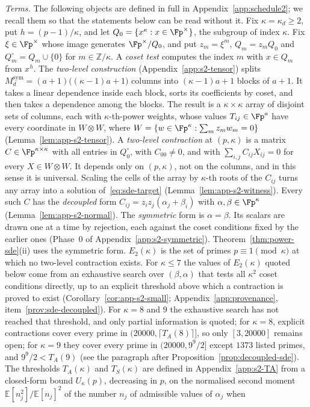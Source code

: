 \noindent\emph{Terms.} The following objects are defined in full in Appendix~\ref{app:schedule2}; we recall them so that the statements below can be read without it. Fix $\kappa = \kappa_d \ge 2$, put $h = (p-1)/\kappa$, and let $Q_0 = \{x^\kappa : x \in \Fp^\times\}$, the subgroup of index $\kappa$. Fix $\xi \in \Fp^\times$ whose image generates $\Fp^\times/Q_0$, and put $z_m = \xi^m$, $Q_m = z_mQ_0$ and $Q_m^\circ = Q_m \cup \{0\}$ for $m \in \mathbb{Z}/\kappa$. A \emph{coset test} computes the index $m$ with $x \in Q_m$ from $x^h$. The \emph{two-level construction} (Appendix~\ref{app:s2-tensor}) splits $M_d^{\mathrm{sym}} = (a+1)\bigl((\kappa-1)a+1\bigr)$ columns into $(\kappa-1)a+1$ blocks of $a+1$. It takes a linear dependence inside each block, sorts its coefficients by coset, and then takes a dependence among the blocks. The result is a $\kappa\times\kappa$ array of disjoint sets of columns, each with $\kappa$-th-power weights, whose values $T_{ij} \in \Fp^a$ have every coordinate in $W \otimes W$, where $W = \{w \in \Fp^\kappa : \sum_m z_mw_m = 0\}$ (Lemma~\ref{lem:app-s2-tensor}). A \emph{two-level contraction} at $(p,\kappa)$ is a matrix $C \in \Fp^{\kappa\times\kappa}$ with all entries in $Q_0^\circ$, with $C_{00} \ne 0$, and with $\sum_{i,j}C_{ij}X_{ij} = 0$ for every $X \in W\otimes W$. It depends only on $(p,\kappa)$, not on the columns, and in this sense it is universal. Scaling the cells of the array by $\kappa$-th roots of the $C_{ij}$ turns any array into a solution of~\eqref{eq:sde-target} (Lemma~\ref{lem:app-s2-witness}). Every such $C$ has the \emph{decoupled} form $C_{ij} = z_iz_j(\alpha_j+\beta_i)$ with $\alpha,\beta \in \Fp^\kappa$ (Lemma~\ref{lem:app-s2-normal}). The \emph{symmetric} form is $\alpha = \beta$. Its scalars are drawn one at a time by rejection, each against the coset conditions fixed by the earlier ones (Phase~0 of Appendix~\ref{app:s2-symmetric}). Theorem~\ref{thm:power-sde}(ii) uses the symmetric form. $E_2(\kappa)$ is the set of primes $p \equiv 1 \pmod\kappa$ at which no two-level contraction exists. For $\kappa \le 7$ the values of $E_2(\kappa)$ quoted below come from an exhaustive search over $(\beta,\alpha)$ that tests all $\kappa^2$ coset conditions directly, up to an explicit threshold above which a contraction is proved to exist (Corollary~\ref{cor:app-s2-small}; Appendix~\ref{app:provenance}, item~\ref{prov:sde-decoupled}). For $\kappa = 8$ and $9$ the exhaustive search has not reached that threshold, and only partial information is quoted; for $\kappa = 8$, explicit contractions cover every prime in $(20000, \lceil T_A(8)\rceil]$, so only $[3,20000]$ remains open; for $\kappa = 9$ they cover every prime in $(20000, 9^9/2]$ except $1373$ listed primes, and $9^9/2 < T_A(9)$ (see the paragraph after Proposition~\ref{prop:decoupled-sde}). The thresholds $T_A(\kappa)$ and $T_S(\kappa)$ are defined in Appendix~\ref{app:s2-TA} from a closed-form bound $U_\kappa(p)$, decreasing in $p$, on the normalised second moment $\mathbb{E}[n_j^2]/\mathbb{E}[n_j]^2$ of the number $n_j$ of admissible values of $\alpha_j$ when 